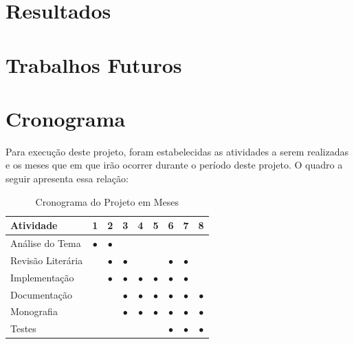\documentclass[
	12pt,				    %
	openright,			    %
	oneside,			    %
	a4paper,			    %
    sumario=tradicional,    %
	english,			    %
	brazil,				    %
	]{abntex2}              %
\begin{document}
\chapter{Resultados}\label{sec:resultados}

\chapter{Trabalhos Futuros}\label{sec:futuro}

\chapter{Cronograma}\label{sec:cronograma}

Para execução deste projeto, foram estabelecidas as atividades a serem realizadas e os meses que em que irão ocorrer durante o período deste projeto. O quadro a seguir apresenta essa relação:

\par

\begin{table}[htbp]
	\centering
	\caption[Cronograma mensal]{Cronograma do Projeto em Meses}
	\label{tab:cronogramaMensal}
	\begin{tabular}{lcccccccc} %
		\toprule
		\textbf{Atividade} & \textbf{1} & \textbf{2} & \textbf{3} & \textbf{4} & \textbf{5} & \textbf{6} & \textbf{7} & \textbf{8} \\
		\midrule
		Análise do Tema    & $\bullet$  & $\bullet$  &            &            &            &            &            &            \\
		Revisão Literária  &            & $\bullet$  & $\bullet$  &            &            & $\bullet$  & $\bullet$  &            \\
		Implementação      &            & $\bullet$  & $\bullet$  & $\bullet$  & $\bullet$  & $\bullet$  & $\bullet$  &            \\
		Documentação       &            &            & $\bullet$  & $\bullet$  & $\bullet$  & $\bullet$  & $\bullet$  & $\bullet$  \\
		Monografia         &            &            & $\bullet$  & $\bullet$  & $\bullet$  & $\bullet$  & $\bullet$  & $\bullet$  \\
		Testes             &            &            &            &            &            & $\bullet$  & $\bullet$  & $\bullet$  \\
		\bottomrule
	\end{tabular}
\end{table}
\end{document}
